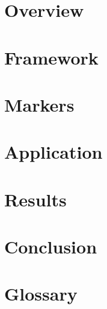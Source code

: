 \documentclass{thesis}
\begin{document}
\frontmatter
\maketitle
\clearpage
\impressum

\cleardoublepage
{}


\cleardoublepage


\tableofcontents

\mainmatter
\chapter{Overview}

\chapter{Framework}

\chapter{Markers}

\chapter{Application}

\chapter{Results}

\chapter{Conclusion}

\chapter*{Glossary}


\appendix
%

\backmatter

\listoffigures




\clearpage
\erklaerung
\end{document}
